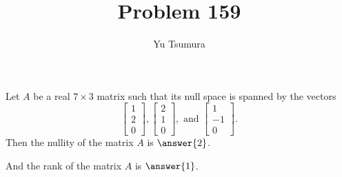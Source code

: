 \documentclass{ximera}
\title{Problem 159}
\author{Yu Tsumura}
\begin{document}
\begin{problem}
	 
  Let $A$ be a real $7\times 3$ matrix such that its null space is spanned by the vectors
  \[\begin{bmatrix}
      1 \\
      2 \\
      0 
    \end{bmatrix}, \begin{bmatrix}
      2 \\
      1 \\
      0 
    \end{bmatrix}, \text{ and } \begin{bmatrix}
      1 \\
      -1 \\
      0 
    \end{bmatrix}.\]
  Then the nullity of the matrix $A$ is $\answer{2}$.
  
  And the rank of the matrix $A$ is $\answer{1}$.
\end{problem}	
\end{document}
